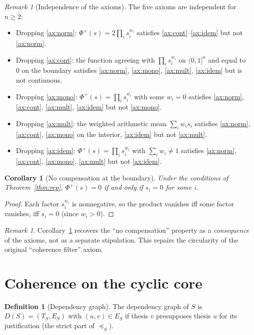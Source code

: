 \documentclass[11pt]{article}
\newtheorem{corollary}[theorem]{Corollary}
\theoremstyle{definition}
\newtheorem{definition}[theorem]{Definition}
\theoremstyle{remark}
\newtheorem{remark}[theorem]{Remark}
\newcommand{\Ph}{\Phi^{+}}
\begin{document}
\begin{remark}[Independence of the axioms]\label{rem:indep}
The five axioms are independent for $n\ge 2$:
\begin{itemize}
\item Dropping \ref{ax:norm}: $\Ph(s)=2\prod_i s_i^{w_i}$ satisfies \ref{ax:cont}--\ref{ax:idem} but not \ref{ax:norm}.
\item Dropping \ref{ax:cont}: the function agreeing with $\prod_i s_i^{w_i}$ on $(0,1]^n$ and equal to $0$ on the boundary satisfies \ref{ax:norm}, \ref{ax:mono}, \ref{ax:mult}, \ref{ax:idem} but is not continuous.
\item Dropping \ref{ax:mono}: $\Ph(s)=\prod_i s_i^{w_i}$ with some $w_i=0$ satisfies \ref{ax:norm}, \ref{ax:cont}, \ref{ax:mult}, \ref{ax:idem} but not \ref{ax:mono}.
\item Dropping \ref{ax:mult}: the weighted arithmetic mean $\sum_i w_i s_i$ satisfies \ref{ax:norm}, \ref{ax:cont}, \ref{ax:mono} on the interior, \ref{ax:idem} but not \ref{ax:mult}.
\item Dropping \ref{ax:idem}: $\Ph(s)=\prod_i s_i^{w_i}$ with $\sum_i w_i\ne 1$ satisfies \ref{ax:norm}, \ref{ax:cont}, \ref{ax:mono}, \ref{ax:mult} but not \ref{ax:idem}.
\end{itemize}
\end{remark}

\begin{corollary}[No compensation at the boundary]\label{cor:nocomp}
Under the conditions of Theorem~\ref{thm:rep}, $\Ph(s)=0$ if and only if $s_i=0$ for some $i$.
\end{corollary}

\begin{proof}
Each factor $s_i^{w_i}$ is nonnegative, so the product vanishes iff some factor vanishes, iff $s_i=0$ (since $w_i>0$).
\end{proof}

\begin{remark}
Corollary~\ref{cor:nocomp} recovers the ``no compensation'' property as a \emph{consequence} of the axioms, not as a separate stipulation. This repairs the circularity of the original ``coherence filter'' axiom.
\end{remark}

\section{Coherence on the cyclic core}\label{sec:coh}

\begin{definition}[Dependency graph]\label{def:graph}
The dependency graph of $S$ is $D(S)=(T_S,E_S)$ with $(u,v)\in E_S$ if thesis $v$ presupposes thesis $u$ for its justification (the strict part of $\preceq_S$).
\end{definition}
\end{document}
